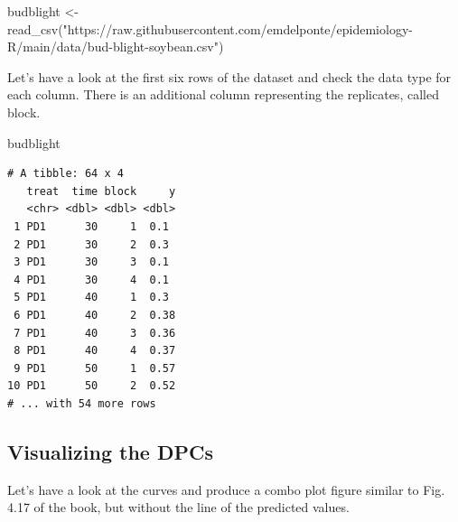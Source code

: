 \documentclass[
  letterpaper,
  DIV=11,
  numbers=noendperiod]{scrreprt}
\newenvironment{Shaded}{\begin{snugshade}}{\end{snugshade}}
\newcommand{\FunctionTok}[1]{\textcolor[rgb]{0.28,0.35,0.67}{#1}}
\newcommand{\NormalTok}[1]{\textcolor[rgb]{0.00,0.23,0.31}{#1}}
\newcommand{\OtherTok}[1]{\textcolor[rgb]{0.00,0.23,0.31}{#1}}
\newcommand{\StringTok}[1]{\textcolor[rgb]{0.13,0.47,0.30}{#1}}
\begin{document}
\begin{Shaded}
\begin{Highlighting}[]
\NormalTok{budblight }\OtherTok{\textless{}{-}} \FunctionTok{read\_csv}\NormalTok{(}\StringTok{"https://raw.githubusercontent.com/emdelponte/epidemiology{-}R/main/data/bud{-}blight{-}soybean.csv"}\NormalTok{)}
\end{Highlighting}
\end{Shaded}

Let's have a look at the first six rows of the dataset and check the
data type for each column. There is an additional column representing
the replicates, called block.

\begin{Shaded}
\begin{Highlighting}[]
\NormalTok{budblight}
\end{Highlighting}
\end{Shaded}

\begin{verbatim}
# A tibble: 64 x 4
   treat  time block     y
   <chr> <dbl> <dbl> <dbl>
 1 PD1      30     1  0.1 
 2 PD1      30     2  0.3 
 3 PD1      30     3  0.1 
 4 PD1      30     4  0.1 
 5 PD1      40     1  0.3 
 6 PD1      40     2  0.38
 7 PD1      40     3  0.36
 8 PD1      40     4  0.37
 9 PD1      50     1  0.57
10 PD1      50     2  0.52
# ... with 54 more rows
\end{verbatim}

\hypertarget{visualizing-the-dpcs}{%
\subsection{Visualizing the DPCs}\label{visualizing-the-dpcs}}

Let's have a look at the curves and produce a combo plot figure similar
to Fig. 4.17 of the book, but without the line of the predicted values.
\end{document}
